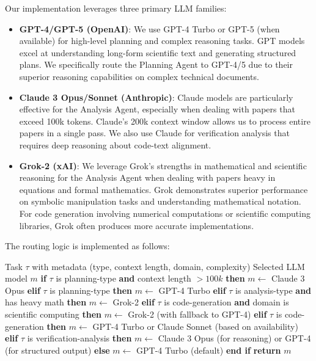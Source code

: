 \documentclass{ieeeaccess}
\begin{document}
Our implementation leverages three primary LLM families:
\begin{itemize}
    \item \textbf{GPT-4/GPT-5 (OpenAI)}: We use GPT-4 Turbo or GPT-5 (when available) for high-level planning and complex reasoning tasks. GPT models excel at understanding long-form scientific text and generating structured plans. We specifically route the Planning Agent to GPT-4/5 due to their superior reasoning capabilities on complex technical documents.
    \item \textbf{Claude 3 Opus/Sonnet (Anthropic)}: Claude models are particularly effective for the Analysis Agent, especially when dealing with papers that exceed 100k tokens. Claude's 200k context window allows us to process entire papers in a single pass. We also use Claude for verification analysis that requires deep reasoning about code-text alignment.
    \item \textbf{Grok-2 (xAI)}: We leverage Grok's strengths in mathematical and scientific reasoning for the Analysis Agent when dealing with papers heavy in equations and formal mathematics. Grok demonstrates superior performance on symbolic manipulation tasks and understanding mathematical notation. For code generation involving numerical computations or scientific computing libraries, Grok often produces more accurate implementations.
\end{itemize}

The routing logic is implemented as follows:
\begin{algorithm}[!t]
\small
\caption{Multi-LLM Routing Strategy}
\label{alg:routing}
\begin{algorithmic}[1]
\Require Task $\tau$ with metadata (type, context length, domain, complexity)
\Ensure Selected LLM model $m$
\State \textbf{if} $\tau$ is planning-type \textbf{and} context length $> 100k$ \textbf{then}
\State \quad $m \gets$ Claude 3 Opus
\State \textbf{elif} $\tau$ is planning-type \textbf{then}
\State \quad $m \gets$ GPT-4 Turbo
\State \textbf{elif} $\tau$ is analysis-type \textbf{and} has heavy math \textbf{then}
\State \quad $m \gets$ Grok-2
\State \textbf{elif} $\tau$ is code-generation \textbf{and} domain is scientific computing \textbf{then}
\State \quad $m \gets$ Grok-2 (with fallback to GPT-4)
\State \textbf{elif} $\tau$ is code-generation \textbf{then}
\State \quad $m \gets$ GPT-4 Turbo or Claude Sonnet (based on availability)
\State \textbf{elif} $\tau$ is verification-analysis \textbf{then}
\State \quad $m \gets$ Claude 3 Opus (for reasoning) or GPT-4 (for structured output)
\State \textbf{else}
\State \quad $m \gets$ GPT-4 Turbo (default)
\State \textbf{end if}
\State \textbf{return} $m$
\end{algorithmic}
\end{algorithm}
\end{document}
